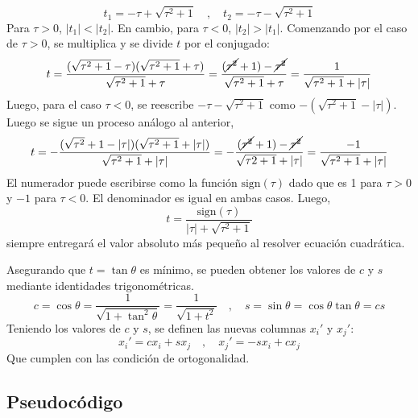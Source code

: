 \documentclass[a4paper]{article}
\begin{document}
\begin{equation}
    t_1 = -\tau + \sqrt{\tau^2 +1 } \quad , \quad t_2 = -\tau - \sqrt{\tau^2 + 1}
\end{equation}
    Para $\tau > 0$, $ |t_1| < |t_2|$. En cambio, para $\tau < 0$, $|t_2| > |t_1|$. Comenzando por el caso de $\tau > 0$, se multiplica y se divide $t$ por el conjugado:
    \begin{equation}
        t = \frac{(\sqrt{\tau^2 + 1} - \tau)(\sqrt{\tau^2 + 1} + \tau)}{\sqrt{\tau^2 +1} + \tau} =  \frac{(\cancel{\tau^2}+1)- \cancel{\tau^2}}{\sqrt{\tau^2 + 1} + \tau}
        = \frac{1}{\sqrt{\tau^2 +1} + |\tau|}
    \end{equation} 
Luego, para el caso $\tau < 0$, se reescribe $-\tau - \sqrt{\tau^2 +1}$ como $-(\sqrt{\tau^2 +1} - |\tau|)$. Luego se sigue un proceso análogo al anterior,
\begin{equation}
    t = -\frac{(\sqrt{\tau^2}+1 - |\tau|)(\sqrt{\tau^2 +1} + |\tau|)}{\sqrt{\tau^2 +1}+ |\tau|} = -\frac{(\cancel{\tau^2}+1)- \cancel{\tau^2}}{\sqrt{\tau{2} + 1}+|\tau|} = \frac{-1}{\sqrt{\tau^2 + 1}+|\tau|}
\end{equation}
El numerador puede escribirse como la función $\text{sign}(\tau)$ dado que es 1 para $\tau > 0$ y $-1$ para $\tau < 0$. El denominador es igual en ambas casos. Luego,
\begin{equation}
    t = \frac{\text{sign}(\tau)}{|\tau| + \sqrt{\tau^2 + 1}}
\end{equation}
siempre entregará el valor absoluto más pequeño al resolver ecuación cuadrática.

Asegurando que $t = \tan \theta$ es mínimo, se pueden obtener los valores de $c$ y $s$ mediante identidades trigonométricas.
\begin{equation}
    c = \cos \theta = \frac{1}{\sqrt{1 + \tan^2 \theta}} = \frac{1}{\sqrt{1 + t^2}} \quad , \quad s = \sin \theta = \cos \theta \tan \theta = cs
\end{equation}
Teniendo los valores de $c$ y $s$, se definen las nuevas columnas $x_i'$ y $x_j'$:
\begin{equation}
    x_i' = cx_i + sx_j \quad , \quad x_j' = -sx_i + cx_j
\end{equation}
Que cumplen con las condición de ortogonalidad.
\subsection{Pseudocódigo}
\end{document}
